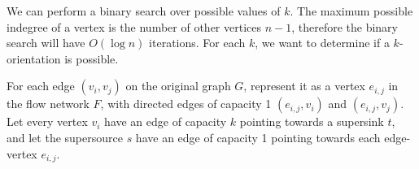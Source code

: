 \documentclass{article}
\begin{document}
\begin{solution}
    We can perform a binary search over possible values of $k$. 
    The maximum possible indegree of a vertex is the number of other vertices $n - 1$,
    therefore the binary search will have $O(\log n)$ iterations.
    For each $k$, we want to determine if a $k$-orientation is possible.

    For each edge $(v_i, v_j)$ on the original graph $G$, 
    represent it as a vertex $e_{i,j}$ in the flow network $F$,
    with directed edges of capacity 1 $(e_{i,j}, v_i)$ and $(e_{i,j}, v_j)$.
    Let every vertex $v_i$ have an edge of capacity $k$ pointing towards a supersink $t$,
    and let the supersource $s$ have an edge of capacity 1 pointing towards each edge-vertex $e_{i,j}$.

    \begin{center}



        \begin{tikzpicture}[x=0.75pt,y=0.75pt,yscale=-1,xscale=1]
        

\end{tikzpicture}
\end{center}
\end{solution}
\end{document}
